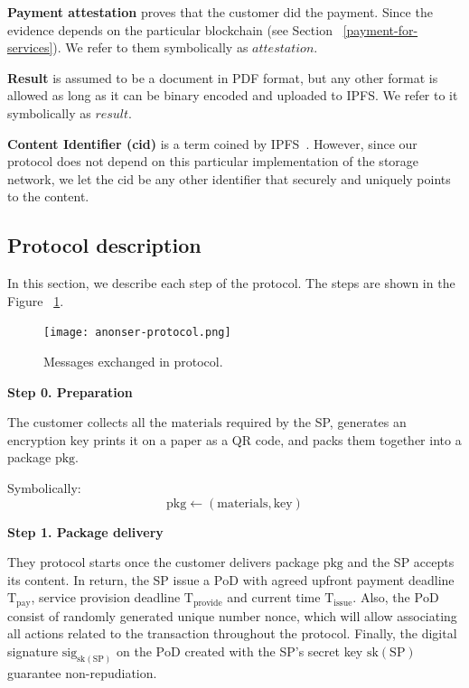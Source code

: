 \documentclass{ieeeaccess}
\begin{document}
\noindent \textbf
{Payment attestation}\label{payment-attestation}
proves that the customer did the payment. Since the
evidence depends on the particular blockchain (see Section ~\ref{payment-for-services}). We refer to them symbolically as
\(attestation\).

\noindent \textbf
{Result}\label{results} is assumed to be a document in PDF format, but any other format is allowed as long as it can be binary encoded and uploaded to IPFS. We refer to it symbolically as $result$.

\noindent \textbf
{Content Identifier (cid)}\label{content-identifier-cid}  is a term coined by IPFS~\cite{Contenta59}. However, since our protocol does not depend on
this particular implementation of the storage network, we let the $\mathrm{cid}$ be any other identifier that securely and uniquely points to the content.

\subsection{Protocol description}\label{protocol-description}

In this section, we describe each step of the protocol. The steps are
shown in the Figure ~\ref{fig:protocol-diagram}.

\begin{figure}[h!]
\texttt{[image: anonser-protocol.png]}
\centering
\caption{Messages exchanged in protocol.}
\label{fig:protocol-diagram}
\end{figure}

\noindent \textbf
{Step 0.  Preparation}\label{step-0-preparation}

The customer collects all the $\mathrm{materials}$ required by the SP, generates an encryption $\mathrm{key}$ prints it on a paper as a QR code, and packs them together into a package $\mathrm{pkg}$.

Symbolically: 
\[
\mathrm{pkg} \gets (\mathrm{materials}, \mathrm{key})
\]

\noindent \textbf
{Step 1. Package delivery}\label{step-1-package-delivery}

They protocol starts once the customer delivers package $\mathrm{pkg}$ and the SP accepts its content. In return, the SP issue a $\mathrm{PoD}$ with agreed upfront payment deadline $\mathrm{T}_\mathrm{pay}$, service provision deadline $\mathrm{T}_\mathrm{provide}$ and current time $\mathrm{T}_\mathrm{issue}$. Also, the $\mathrm{PoD}$ consist of randomly generated unique number $\mathrm{nonce}$, which will allow associating all actions related to the transaction throughout the protocol. Finally, the digital signature $\mathrm{sig}_{\mathrm{sk}(\mathrm{SP})}$ on the $\mathrm{PoD}$ created with the SP's secret key $\mathrm{sk}(\mathrm{SP})$ guarantee non-repudiation.
\end{document}
